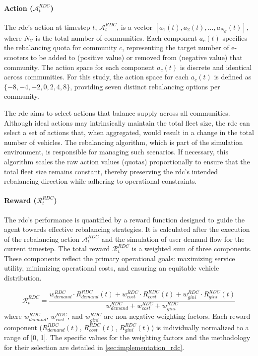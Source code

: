 \paragraph{Action ($\mathcal{A}^{RDC}_t$)}
The \gls{rdc}'s action at timestep $t$, $\mathcal{A}^{RDC}_t$, is a vector $[a_1(t), a_2(t), ..., a_{N_{\mathcal{C}}}(t)]$, where $N_{\mathcal{C}}$ is the total number of communities.
Each component $a_c(t)$ specifies the rebalancing quota for community $c$, representing the target number of e-scooters to be added to (positive value) or removed from (negative value) that community.
The action space for each component $a_c(t)$ is discrete and identical across communities. For this study, the action space for each $a_c(t)$ is defined as $\{-8, -4, -2, 0, 2, 4, 8\}$, providing seven distinct rebalancing options per community.

The \gls{rdc} aims to select actions that balance supply across all communities.
Although ideal actions may intrinsically maintain the total fleet size, the \gls{rdc} can select a set of actions that, when aggregated, would result in a change in the total number of vehicles.
The rebalancing algorithm, which is part of the simulation environment, is responsible for managing such scenarios.
If necessary, this algorithm scales the raw action values (quotas) proportionally to ensure that the total fleet size remains constant, thereby preserving the \gls{rdc}'s intended rebalancing direction while adhering to operational constraints.

\paragraph{Reward ($\mathcal{R}^{RDC}_t$)}
The \gls{rdc}'s performance is quantified by a reward function designed to guide the agent towards effective rebalancing strategies.
It is calculated after the execution of the rebalancing action $\mathcal{A}^{RDC}_t$ and the simulation of user demand flow for the current timestep. The total reward $\mathcal{R}^{RDC}_t$ is a weighted sum of three components.
These components reflect the primary operational goals: maximizing service utility, minimizing operational costs, and ensuring an equitable vehicle distribution.

\begin{equation}\label{eq:rdc-reward}
    \mathcal{R}^{RDC}_t = \frac{w_{demand}^{RDC} \cdot R_{demand}^{RDC}(t) + w_{cost}^{RDC} \cdot R_{cost}^{RDC}(t) + w_{gini}^{RDC} \cdot R_{gini}^{RDC}(t)}{w_{demand}^{RDC}+ w_{cost}^{RDC}+ w_{gini}^{RDC}}
\end{equation}
where $w_{demand}^{RDC}$, $w_{cost}^{RDC}$, and $w_{gini}^{RDC}$ are non-negative weighting factors. Each reward component ($R_{demand}^{RDC}(t)$, $R_{cost}^{RDC}(t)$, $R_{gini}^{RDC}(t)$) is individually normalized to a range of [0, 1].
The specific values for the weighting factors and the methodology for their selection are detailed in \autoref{sec:implementation_rdc}.

